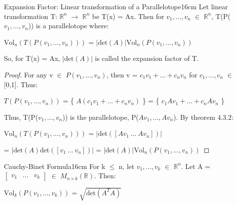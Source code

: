     \vspace{0.5cm}



    \begin{corollary}{Expansion Factor:
    Linear transformation of a Parallelotope}{16cm}
        Let linear transformation T: $\mathbb{R}^n$ $\rightarrow$ $\mathbb{R}^n$
        be T(x) = Ax. Then for $v_1,...,v_n$ $\in$ $\mathbb{R}^n$,
        T(P($v_1,...,v_n$)) is a parallelotope where:

        \hspace{0.5cm}
        $\text{Vol}_n(T(P(v_1,...,v_n)))$
        = $|\text{det}(A)| \text{Vol}_n(P(v_1,...,v_n))$

        So, for T(x) = Ax, $|\text{det}(A)|$ is called the
        {\color{lblue} expansion factor} of T.
    \end{corollary}

    \begin{proof}
        For any v $\in$ $P(v_1,...,v_n)$, then
        v = $c_1v_1 + ... + c_nv_n$ for $c_1,...,c_n$ $\in$ [0,1].
        Thus:

        \hspace{0.5cm}
        $T(P(v_1,...,v_n))$
        = \{ $A(c_1v_1 + ... + c_nv_n)$ \}
        = \{ $c_1Av_1 + ... + c_nAv_n$ \}

        Thus, T(P($v_1,...,v_n$)) is the parallelotope,
        P($Av_1,...,Av_n$).
        By {\color{red} theorem 4.3.2}:

        \hspace{0.5cm}
        $\text{Vol}_n(T(P(v_1,...,v_n)))$
        = $|\text{det}([Av_1 \ ... \ Av_n])|$

        \hspace{4.5cm}
        = $|\text{det}(A)\text{det}([v_1 \ ... \ v_n])|$
        = $|\text{det}(A)| \text{Vol}_n(P(v_1,...,v_n))$
    \end{proof}

    \newpage



    \begin{wtheorem}{Cauchy-Binet Formula}{16cm}
        For k $\leq$ n, let $v_1,...,v_k$ $\in$ $\mathbb{R}^n$.
        Let A =
        $\begin{bmatrix}
            v_1 & ... & v_k
        \end{bmatrix}$
        $\in$ $M_{n \times k}(\mathbb{R})$. Then:

        \hspace{0.5cm}
        $\text{Vol}_k(P(v_1,...,v_k))$
        = $\sqrt{\text{det}(A^TA)}$
    \end{wtheorem}

